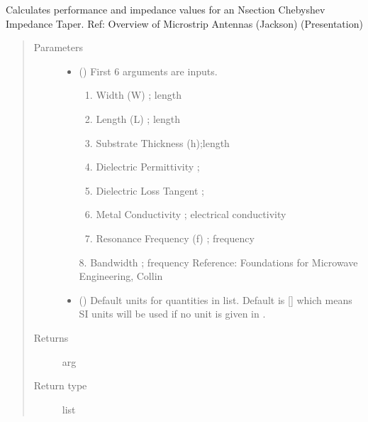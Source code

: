 \documentclass[letterpaper,10pt,english]{sphinxmanual}
\begin{document}

\begin{fulllineitems}
\label{\detokenize{components:components.Patch_Antenna_Analysis}}
Calculates performance and impedance values for an N\sphinxhyphen{}section Chebyshev Impedance Taper.
Ref: Overview of Microstrip Antennas (Jackson) (Presentation)
\begin{quote}\begin{description}
\item[{Parameters}] \leavevmode\begin{itemize}
\item {} 
 () \textendash{} 
First 6 arguments are inputs.
\begin{enumerate}
%
\item {} 
Width (W) ; length

\item {} 
Length (L) ; length

\item {} 
Substrate Thickness (h);length

\item {} 
Dielectric Permittivity ;

\item {} 
Dielectric Loss Tangent ;

\item {} 
Metal Conductivity ; electrical conductivity

\item {} 
Resonance Frequency (f) ; frequency

\end{enumerate}

8.  Bandwidth ; frequency
Reference:  Foundations for Microwave Engineering, Collin


\item {} 
 (\sphinxstyleliteralemphasis{\sphinxupquote{, }}) \textendash{} Default units for quantities in  list. Default is {[}{]} which means SI units will be used if no unit is given in .

\end{itemize}

\item[{Returns}] \leavevmode
arg

\item[{Return type}] \leavevmode
list

\end{description}\end{quote}

\end{fulllineitems}
\end{document}
